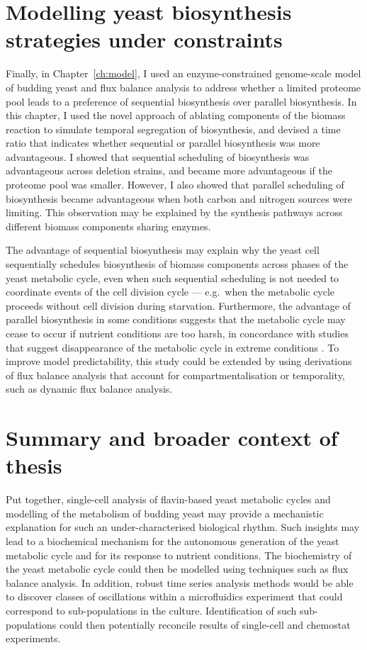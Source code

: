 \section{Modelling yeast biosynthesis strategies under constraints}
\label{sec:concl-model}

Finally, in Chapter~\ref{ch:model}, I used an enzyme-constrained genome-scale model of budding yeast and flux balance analysis to address whether a limited proteome pool leads to a preference of sequential biosynthesis over parallel biosynthesis.
In this chapter, I used the novel approach of ablating components of the biomass reaction to simulate temporal segregation of biosynthesis, and devised a time ratio that indicates whether sequential or parallel biosynthesis was more advantageous.
I showed that sequential scheduling of biosynthesis was advantageous across deletion strains, and became more advantageous if the proteome pool was smaller.
However, I also showed that parallel scheduling of biosynthesis became advantageous when both carbon and nitrogen sources were limiting.
This observation may be explained by the synthesis pathways across different biomass components sharing enzymes.

The advantage of sequential biosynthesis may explain why the yeast cell sequentially schedules biosynthesis of biomass components across phases of the yeast metabolic cycle, even when such sequential scheduling is not needed to coordinate events of the cell division cycle --- e.g.\ when the metabolic cycle proceeds without cell division during starvation.
Furthermore, the advantage of parallel biosynthesis in some conditions suggests that the metabolic cycle may cease to occur if nutrient conditions are too harsh, in concordance with studies that suggest disappearance of the metabolic cycle in extreme conditions \parencite{oneillEukaryoticCellBiology2020}.
To improve model predictability, this study could be extended by using derivations of flux balance analysis that account for compartmentalisation or temporality, such as dynamic flux balance analysis.


\section{Summary and broader context of thesis}
\label{sec:concl-summary}

Put together, single-cell analysis of flavin-based yeast metabolic cycles and modelling of the metabolism of budding yeast may provide a mechanistic explanation for such an under-characterised biological rhythm.
Such insights may lead to a biochemical mechanism for the autonomous generation of the yeast metabolic cycle and for its response to nutrient conditions.
The biochemistry of the yeast metabolic cycle could then be modelled using techniques such as flux balance analysis.
In addition, robust time series analysis methods would be able to discover classes of oscillations within a microfluidics experiment that could correspond to sub-populations in the culture.
Identification of such sub-populations could then potentially reconcile results of single-cell and chemostat experiments.

